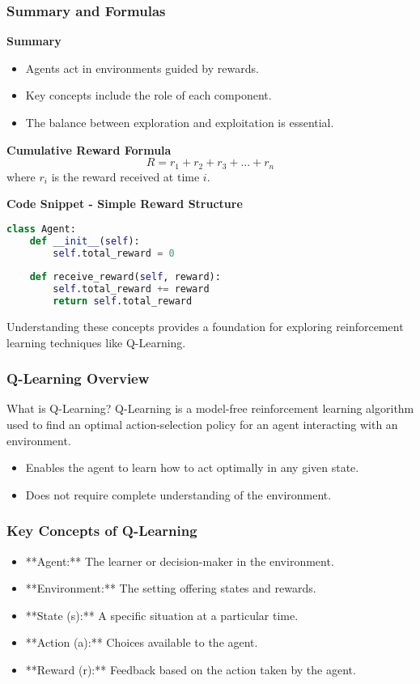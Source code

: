 \documentclass[aspectratio=169]{beamer}
\begin{document}
\begin{frame}[fragile]
  \frametitle{Summary and Formulas}
  \textbf{Summary}
  \begin{itemize}
    \item Agents act in environments guided by rewards.
    \item Key concepts include the role of each component.
    \item The balance between exploration and exploitation is essential.
  \end{itemize}

  \textbf{Cumulative Reward Formula}
  \begin{equation}
    R = r_1 + r_2 + r_3 + ... + r_n
  \end{equation}
  where \( r_i \) is the reward received at time \( i \).

  \textbf{Code Snippet - Simple Reward Structure}
  \begin{lstlisting}[language=Python]
class Agent:
    def __init__(self):
        self.total_reward = 0
        
    def receive_reward(self, reward):
        self.total_reward += reward
        return self.total_reward
  \end{lstlisting}

  Understanding these concepts provides a foundation for exploring reinforcement learning techniques like Q-Learning.
\end{frame}

\begin{frame}[fragile]
  \frametitle{Q-Learning Overview}
  \begin{block}{What is Q-Learning?}
    Q-Learning is a model-free reinforcement learning algorithm 
    used to find an optimal action-selection policy for an agent 
    interacting with an environment.
  \end{block}
  
  \begin{itemize}
    \item Enables the agent to learn how to act optimally in any given state.
    \item Does not require complete understanding of the environment.
  \end{itemize}
\end{frame}

\begin{frame}[fragile]
  \frametitle{Key Concepts of Q-Learning}
  \begin{itemize}
    \item **Agent:** The learner or decision-maker in the environment.
    \item **Environment:** The setting offering states and rewards.
    \item **State (s):** A specific situation at a particular time.
    \item **Action (a):** Choices available to the agent.
    \item **Reward (r):** Feedback based on the action taken by the agent.
  \end{itemize}
\end{frame}
\end{document}
